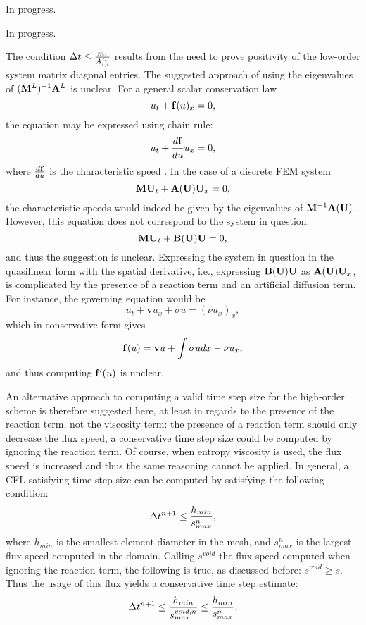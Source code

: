 \begin{enumerate}
In progress.

In progress.

The condition $\Delta t\leq\frac{m_i}{A^L_{i,i}}$ results from the need to prove
positivity of the low-order system matrix diagonal entries. The suggested approach
of using the eigenvalues of $(\mathbf{M}^L)^{-1}\mathbf{A}^L$ is unclear. For a general scalar conservation
law
\[
  u_t + \mathbf{f}(u)_x = 0,
\]
the equation may be expressed using chain rule:
\[
  u_t + \frac{d\mathbf{f}}{du}u_x = 0,
\]
where $\frac{d\mathbf{f}}{du}$ is the characteristic speed \cite{toro}. In the case of a
discrete FEM system
\[
  \mathbf{M}\mathbf{U}_t + \mathbf{A}(\mathbf{U})\mathbf{U}_x = 0,
\]
the characteristic speeds would indeed be given by the eigenvalues of $\mathbf{M}^{-1}\mathbf{A}(\mathbf{U})$.
However, this equation does not correspond to the system in question:
\[
  \mathbf{M}\mathbf{U}_t + \mathbf{B}(\mathbf{U})\mathbf{U} = 0,
\]
and thus the suggestion is unclear. Expressing the system in question in the
quasilinear form with the spatial derivative, i.e., expressing $\mathbf{B}(\mathbf{U})\mathbf{U}$
as $\mathbf{A}(\mathbf{U})\mathbf{U}_x$, is complicated by the presence of a reaction term and an
artificial diffusion term. For instance, the governing equation would be
\[
  u_t + \mathbf{v}u_x + \sigma u = (\nu u_x)_x,
\]
which in conservative form gives
\[
  \mathbf{f}(u) = \mathbf{v}u + \int\sigma u dx - \nu u_x,
\]
and thus computing $\mathbf{f}'(u)$ is unclear.

An alternative approach to computing a valid time step size for the high-order
scheme is therefore suggested here, at least in regards to the presence of the
reaction term, not the viscosity term: the presence of a reaction term should only decrease
the flux speed, a conservative time step size could be computed by ignoring
the reaction term. Of course, when entropy viscosity is used, the flux speed
is increased and thus the same reasoning cannot be applied. In general, a CFL-satisfying
time step size can be computed by satisfying the following condition:
\[
  \Delta t^{n+1}\leq\frac{h_{min}}{s_{max}^n},
\]
where $h_{min}$ is the smallest element diameter in the mesh, and $s_{max}^n$ is the
largest flux speed computed in the domain. Calling $s^{void}$ the flux speed
computed when ignoring the reaction term, the following is true, as discussed
before: $s^{void}\geq s$. Thus the usage of this flux yields a conservative
time step estimate:
\[
  \Delta t^{n+1}\leq\frac{h_{min}}{s_{max}^{void,n}}\leq\frac{h_{min}}{s_{max}^{n}}.
\]


\end{enumerate}
